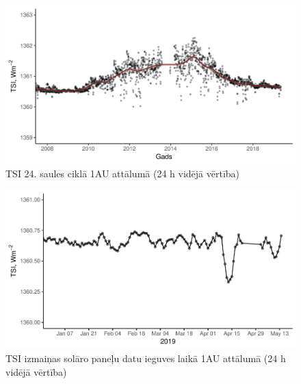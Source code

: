 \begin{figure}[h]
    \centering
    \includegraphics[width=\linewidth]{figures/misc/TSI_8-19.pdf}
    \caption{TSI 24. saules ciklā 1AU attālumā (24 h vidējā vērtība)\cite{TSIdata}}
    \label{fig:TSI1}
\end{figure}

\begin{figure}[h]
    \centering
    \includegraphics[width=\linewidth]{figures/misc/TSI.pdf}
    \caption{TSI izmaiņas solāro paneļu datu ieguves laikā 1AU attālumā (24 h vidējā vērtība)\cite{TSIdata}}
    \label{fig:TSI2}
\end{figure}


